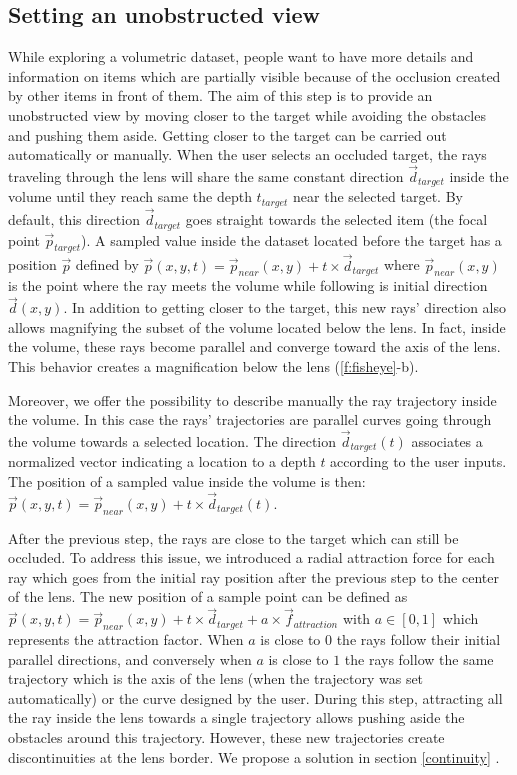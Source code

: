 \subsection{Setting an unobstructed view }
While exploring a volumetric dataset, people want to have more details and information on items which are partially visible because of the occlusion created by other items in front of them. The aim of this step is to provide an unobstructed view by moving closer to the target while avoiding the obstacles and pushing them aside.
Getting closer to the target can be carried out automatically or manually. When the user selects an occluded target, the rays traveling through the lens will share the same constant direction $\vec{d}_{target}$ inside the volume until they reach same the depth $t_{target}$ near the selected target. By default, this direction  $\vec{d}_{target}$ goes straight towards the selected item (the focal point $\vec{p}_{target}$). A sampled value inside the dataset located before the target has a position $\vec{p}$ defined by $\vec{p}\left(x,y,t\right) = \vec{p}_{near}\left(x,y\right) + t \times \vec{d}_{target}$ where $\vec{p}_{near}\left(x,y\right)$ is the point where the ray meets the volume while following is initial direction $\vec{d}\left(x,y\right)$. In addition to getting closer to the target, this new rays' direction also allows magnifying the subset of the volume located below the lens. In fact, inside the volume, these rays become parallel and converge toward the axis of the lens. This behavior creates a magnification below the lens (\autoref{f:fisheye}-b). 

Moreover, we offer the possibility to describe manually the ray trajectory inside the volume. In this case the rays' trajectories are parallel curves going through the volume towards a selected location. The direction $\vec{d}_{target}\left(t\right)$ associates a normalized vector indicating a location to a depth $t$ according to the user inputs. The position of a sampled value inside the volume is then: $\vec{p}\left(x,y,t\right) = \vec{p}_{near}\left(x,y\right) + t \times \vec{d}_{target}\left(t\right)$.

After the previous step, the rays are close to the target which can still be occluded. To address this issue, we introduced a radial attraction force for each ray which goes from the initial ray position after the previous step to the center of the lens. The new position of a sample point can be defined as $\vec{p}\left(x,y,t\right) = \vec{p}_{near}\left(x,y\right) + t \times \vec{d}_{target} + a \times \vec{f}_{attraction} $ with $a \in \left[0,1\right]$ which represents the attraction factor. When $a$ is close to $0$ the rays follow their initial parallel directions, and conversely when $a$ is close to $1$ the rays follow the same trajectory which is the axis of the lens (when the trajectory was set automatically) or the curve designed by the user. During this step, attracting all the ray inside the lens towards a single trajectory allows pushing aside the obstacles around this trajectory.  
However, these new trajectories create discontinuities at the lens border. We propose a solution in  section \ref{continuity} . 


